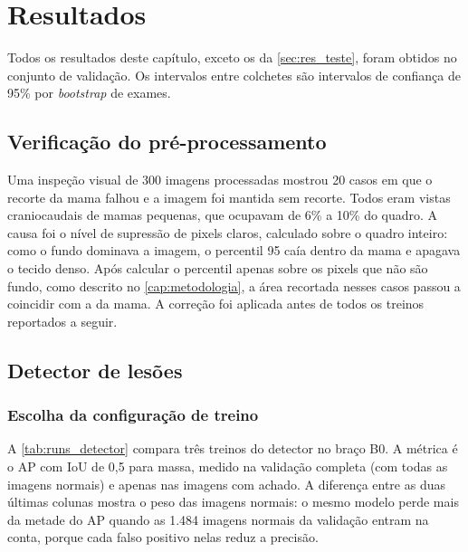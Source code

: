\chapter{Resultados}\label{cap:resultados}

Todos os resultados deste capítulo, exceto os da \autoref{sec:res_teste}, foram obtidos no conjunto de validação. Os intervalos entre colchetes são intervalos de confiança de 95\% por \textit{bootstrap} de exames.

\section{Verificação do pré-processamento}

Uma inspeção visual de 300 imagens processadas mostrou 20 casos em que o recorte da mama falhou e a imagem foi mantida sem recorte. Todos eram vistas craniocaudais de mamas pequenas, que ocupavam de 6\% a 10\% do quadro. A causa foi o nível de supressão de pixels claros, calculado sobre o quadro inteiro: como o fundo dominava a imagem, o percentil 95 caía dentro da mama e apagava o tecido denso. Após calcular o percentil apenas sobre os pixels que não são fundo, como descrito no \autoref{cap:metodologia}, a área recortada nesses casos passou a coincidir com a da mama. A correção foi aplicada antes de todos os treinos reportados a seguir.


\section{Detector de lesões}

\subsection{Escolha da configuração de treino}

A \autoref{tab:runs_detector} compara três treinos do detector no braço B0. A métrica é o AP com IoU de 0,5 para massa, medido na validação completa (com todas as imagens normais) e apenas nas imagens com achado. A diferença entre as duas últimas colunas mostra o peso das imagens normais: o mesmo modelo perde mais da metade do AP quando as 1.484 imagens normais da validação entram na conta, porque cada falso positivo nelas reduz a precisão.

